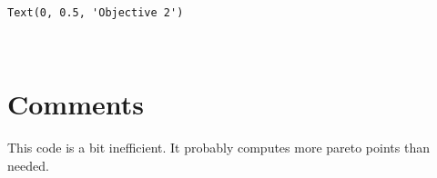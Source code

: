 \documentclass[11pt]{article}
\makeatletter
\newcommand{\boxspacing}{\kern\kvtcb@left@rule\kern\kvtcb@boxsep}
\newcommand{\prompt}[4]{
        {\ttfamily\llap{{\color{#2}[#3]:\hspace{3pt}#4}}\vspace{-\baselineskip}}
    }
\makeatother
\begin{document}
            \begin{tcolorbox}[breakable, size=fbox, boxrule=.5pt, pad at break*=1mm, opacityfill=0]
\prompt{Out}{outcolor}{12}{\boxspacing}
\begin{Verbatim}[commandchars=\\\{\}]
Text(0, 0.5, 'Objective 2')
\end{Verbatim}
\end{tcolorbox}
        
    \begin{center}
    \end{center}
    { \hspace*{\fill} \\}
    
    \hypertarget{comments}{%
\section{Comments}\label{comments}}

This code is a bit inefficient. It probably computes more pareto points
than needed.


    
    
    
\end{document}
